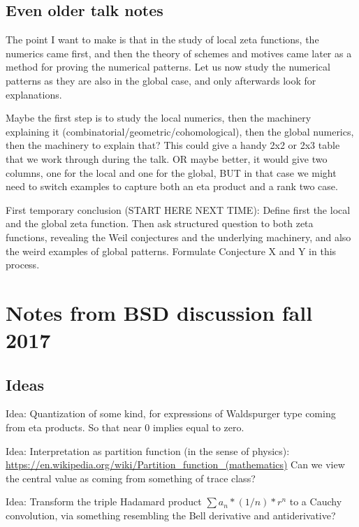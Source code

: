 \documentclass[paper=a4, fontsize=11pt]{scrartcl} %
\numberwithin{equation}{section} %
\numberwithin{figure}{section} %
\numberwithin{table}{section} %
\begin{document}
\subsection{Even older talk notes}

The point I want to make is that in the study of local zeta functions, the numerics came first, and then the theory of schemes and motives came later as a method for proving the numerical patterns. Let us now study the numerical patterns as they are also in the global case, and only afterwards look for explanations.

Maybe the first step is to study the local numerics, then the machinery explaining it (combinatorial/geometric/cohomological), then the global numerics, then the machinery to explain that? This could give a handy 2x2 or 2x3 table that we work through during the talk. OR maybe better, it would give two columns, one for the local and one for the global, BUT in that case we might need to switch examples to capture both an eta product and a rank two case.

First temporary conclusion (START HERE NEXT TIME): Define first the local and the global zeta function. Then ask structured question to both zeta functions, revealing the Weil conjectures and the underlying machinery, and also the weird examples of global patterns. Formulate Conjecture X and Y in this process.




\appendix

\newpage
\section{Notes from BSD discussion fall 2017}

\subsection{Ideas}

Idea: Quantization of some kind, for expressions of Waldspurger type coming from eta products. So that near 0 implies equal to zero.

Idea: Interpretation as partition function (in the sense of physics):
\url{https://en.wikipedia.org/wiki/Partition_function_(mathematics)}
Can we view the central value as coming from something of trace class?

Idea: Transform the triple Hadamard product $\sum a_n * (1/n) * r^n$ to a Cauchy convolution, via something resembling the Bell derivative and antiderivative?
\end{document}
